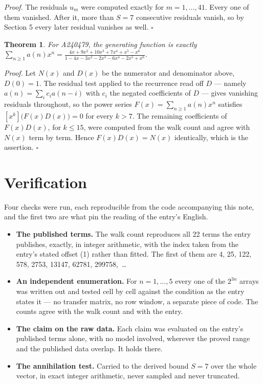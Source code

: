 \documentclass[11pt]{article}
\newtheorem{theorem}{Theorem}
\theoremstyle{definition}
\begin{document}
{\itshape Proof.} The residuals $u_m$ were computed exactly for $m = 1,\dots,41$. Every one of them vanished. After it, more than $S = 7$ consecutive residuals vanish, so by Section 5 every later residual vanishes as well. $\square$

\begin{theorem} For A240479, the generating function is exactly $\sum_{n\ge 1} a(n)x^n = \frac{4x + 9x^{2} + 10x^{3} + 7x^{4} + x^{5} - x^{6}}{1 - 4x - 3x^{2} - 2x^{3} - 6x^{4} - 2x^{5} + x^{6}}$.\end{theorem}

{\itshape Proof.} Let $N(x)$ and $D(x)$ be the numerator and denominator above, $D(0)=1$. The residual test applied to the recurrence read off $D$ --- namely $a(n) = \sum_i c_i a(n-i)$ with $c_i$ the negated coefficients of $D$ --- gives vanishing residuals throughout, so the power series $F(x)=\sum_{n\ge 1}a(n)x^n$ satisfies $[x^k]\bigl(F(x)D(x)\bigr) = 0$ for every $k > 7$. The remaining coefficients of $F(x)D(x)$, for $k \le 15$, were computed from the walk count and agree with $N(x)$ term by term. Hence $F(x)D(x) = N(x)$ identically, which is the assertion. $\square$

\section{Verification}

Four checks were run, each reproducible from the code accompanying this note, and the first two are what pin the reading of the entry's English.

\begin{itemize}

\item {\bfseries The published terms.} The walk count reproduces all 22 terms the entry publishes, exactly, in integer arithmetic, with the index taken from the entry's stated offset (1) rather than fitted. The first of them are 4, 25, 122, 578, 2753, 13147, 62781, 299758,~\dots

\item {\bfseries An independent enumeration.} For $n = 1,\dots,5$ every one of the $2^{3n}$ arrays was written out and tested cell by cell against the condition as the entry states it --- no transfer matrix, no row window, a separate piece of code. The counts agree with the walk count and with the entry.

\item {\bfseries The claim on the raw data.} Each claim was evaluated on the entry's published terms alone, with no model involved, wherever the proved range and the published data overlap. It holds there.

\item {\bfseries The annihilation test.} Carried to the derived bound $S = 7$ over the whole vector, in exact integer arithmetic, never sampled and never truncated.

\end{itemize}
\end{document}
